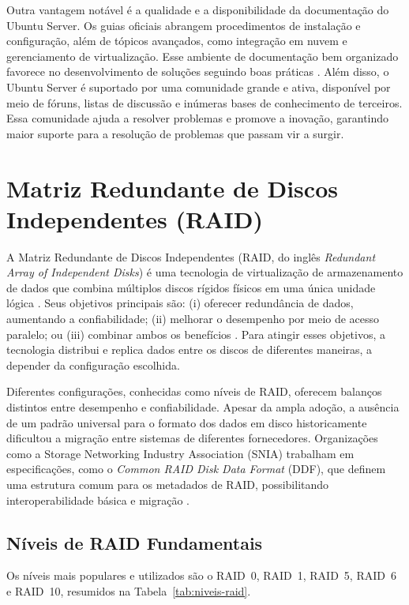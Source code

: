 Outra vantagem notável é a qualidade e a disponibilidade da documentação do Ubuntu Server. Os guias oficiais abrangem procedimentos de instalação e configuração, além de tópicos avançados, como integração em nuvem e gerenciamento de virtualização. Esse ambiente de documentação bem organizado favorece no desenvolvimento de soluções seguindo boas práticas \cite{ubuntu2025}. Além disso, o Ubuntu Server é suportado por uma comunidade grande e ativa, disponível por meio de fóruns, listas de discussão e inúmeras bases de conhecimento de terceiros. Essa comunidade ajuda a resolver problemas e promove a inovação, garantindo maior suporte para a resolução de problemas que passam vir a surgir.


\section{Matriz Redundante de Discos Independentes (RAID)}

\label{sec:raid}

A Matriz Redundante de Discos Independentes (RAID, do inglês \textit{Redundant Array of Independent Disks}) é uma tecnologia de virtualização de armazenamento de dados que combina múltiplos discos rígidos físicos em uma única unidade lógica \cite{lee2021}. Seus objetivos principais são: (i) oferecer redundância de dados, aumentando a confiabilidade; (ii) melhorar o desempenho por meio de acesso paralelo; ou (iii) combinar ambos os benefícios \cite{lee2021, techtarget2023}. Para atingir esses objetivos, a tecnologia distribui e replica dados entre os discos de diferentes maneiras, a depender da configuração escolhida.

Diferentes configurações, conhecidas como níveis de RAID, oferecem balanços distintos entre desempenho e confiabilidade. Apesar da ampla adoção, a ausência de um padrão universal para o formato dos dados em disco historicamente dificultou a migração entre sistemas de diferentes fornecedores. Organizações como a Storage Networking Industry Association (SNIA) trabalham em especificações, como o \textit{Common RAID Disk Data Format} (DDF), que definem uma estrutura comum para os metadados de RAID, possibilitando interoperabilidade básica e migração \cite{snia2016}.

\subsection{Níveis de RAID Fundamentais}

Os níveis mais populares e utilizados são o RAID~0, RAID~1, RAID~5, RAID~6 e RAID~10, resumidos na Tabela~\ref{tab:niveis-raid}.

